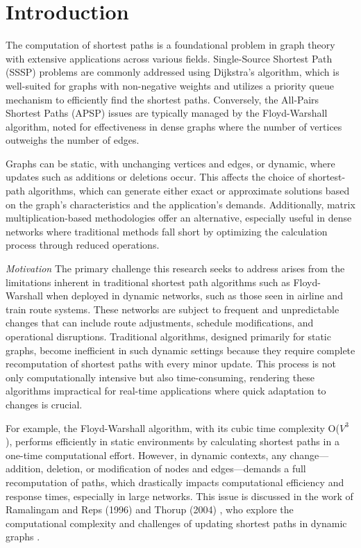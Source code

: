 \documentclass[conference]{IEEEtran}
\begin{document}
\section{Introduction}
The computation of shortest paths is a foundational problem in graph theory with extensive applications across various fields. Single-Source Shortest Path (SSSP) problems are commonly addressed using Dijkstra's algorithm, which is well-suited for graphs with non-negative weights and utilizes a priority queue mechanism to efficiently find the shortest paths. Conversely, the All-Pairs Shortest Paths (APSP) issues are typically managed by the Floyd-Warshall algorithm, noted for effectiveness in dense graphs where the number of vertices outweighs the number of edges.

Graphs can be static, with unchanging vertices and edges, or dynamic, where updates such as additions or deletions occur. This affects the choice of shortest-path algorithms, which can generate either exact or approximate solutions based on the graph's characteristics and the application's demands. Additionally, matrix multiplication-based methodologies offer an alternative, especially useful in dense networks where traditional methods fall short by optimizing the calculation process through reduced operations.

\noindent\textit{Motivation}
The primary challenge this research seeks to address arises from the limitations inherent in traditional shortest path algorithms such as Floyd-Warshall when deployed in dynamic networks, such as those seen in airline and train route systems. These networks are subject to frequent and unpredictable changes that can include route adjustments, schedule modifications, and operational disruptions. Traditional algorithms, designed primarily for static graphs, become inefficient in such dynamic settings because they require complete recomputation of shortest paths with every minor update. This process is not only computationally intensive but also time-consuming, rendering these algorithms impractical for real-time applications where quick adaptation to changes is crucial.

For example, the Floyd-Warshall algorithm, with its cubic time complexity O($V^3$), performs efficiently in static environments by calculating shortest paths in a one-time computational effort. However, in dynamic contexts, any change—addition, deletion, or modification of nodes and edges—demands a full recomputation of paths, which drastically impacts computational efficiency and response times, especially in large networks. This issue is discussed in the work of Ramalingam and Reps (1996)\cite{10.1006/jagm.1996.0046}{} and Thorup (2004) \cite{5598048}, who explore the computational complexity and challenges of updating shortest paths in dynamic graphs .
\end{document}
